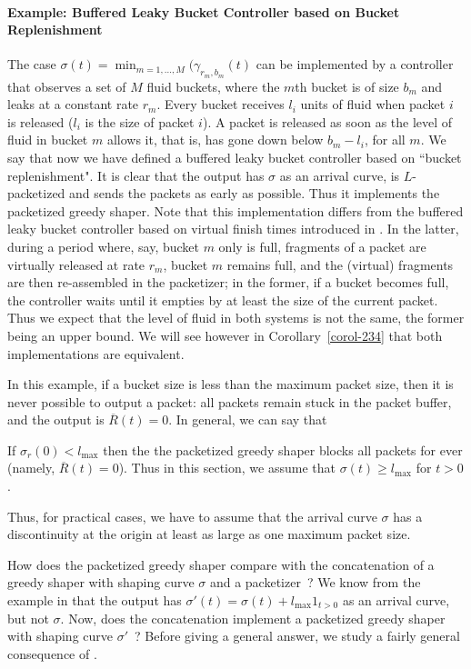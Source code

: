 \paragraph{Example: Buffered Leaky Bucket Controller based on
Bucket Replenishment}  The case $\sigma(t)= \min_{m=1,...,M}
(\gamma_{r_m, b_m}(t)$ can be implemented by a controller that
observes a set of $M$ fluid buckets, where the $m$th bucket is of
size $b_m$ and leaks at a constant rate $r_m$. Every bucket
receives $l_i$ units of fluid when packet $i$ is released ($l_i$
is the size of packet $i$). A packet is released as soon as the
level of fluid in bucket $m$ allows it, that is, has gone down
below $b_m - l_i$, for all $m$. We say that now we have defined a
buffered leaky bucket controller based on ``bucket replenishment".
It is clear that the output has $\sigma$ as an arrival curve, is
$L$-packetized and sends the packets as early as possible. Thus it
implements the packetized greedy shaper. Note that this
implementation differs from the buffered leaky bucket controller
based on virtual finish times introduced in . In
the latter, during a period where, say, bucket $m$ only is full,
fragments of a packet are virtually released at rate $r_m$, bucket
$m$ remains full, and the (virtual) fragments are then
re-assembled in the packetizer; in the former, if a bucket becomes
full, the controller waits until it empties by at least the size
of the current packet. Thus we expect that the level of fluid in
both systems is not the same, the former being an upper bound. We
will see however in Corollary~\ref{corol-234} that both
implementations are equivalent.

In this example, if a bucket size is less than the maximum packet
size, then it is never possible to output a packet: all packets
remain stuck in the packet buffer, and the output is
$\overline{R}(t)=0$. In general, we can say that
\begin{proposition}
If $\sigma_r(0) < l_{\max}$ then the the packetized greedy shaper
blocks all packets for ever (namely, $\overline{R}(t)=0$). Thus in
this section, we assume that $\sigma(t) \geq l_{\max}$ for $t>0$.
\end{proposition}
Thus, for practical cases, we have to assume that the arrival
curve $\sigma$ has a discontinuity at the origin at least as large
as one maximum packet size.

How does the packetized greedy shaper compare with the
concatenation of a greedy shaper with shaping curve $\sigma$ and a
packetizer~? We know from the example in  that the
output has $\sigma'(t)= \sigma(t) + l_{\max} 1_{t>0}$ as an
arrival curve, but not $\sigma$. Now, does the concatenation
implement a packetized greedy shaper with shaping curve
$\sigma'$~?  Before giving a general answer, we study a fairly
general consequence of .

